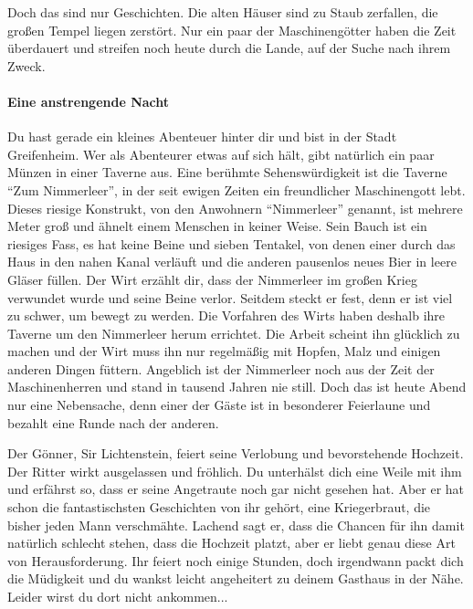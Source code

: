 Doch das sind nur Geschichten. Die alten Häuser sind zu Staub zerfallen, die großen Tempel liegen zerstört. Nur ein paar der Maschinengötter haben die Zeit überdauert und streifen noch heute durch die Lande, auf der Suche nach ihrem Zweck.

\paragraph{Eine anstrengende Nacht}

Du hast gerade ein kleines Abenteuer hinter dir und bist in der Stadt Greifenheim. Wer als Abenteurer etwas auf sich hält, gibt natürlich ein paar Münzen in einer Taverne aus. Eine berühmte Sehenswürdigkeit ist die Taverne ``Zum Nimmerleer'', in der seit ewigen Zeiten ein freundlicher Maschinengott lebt. Dieses riesige Konstrukt, von den Anwohnern ``Nimmerleer'' genannt, ist mehrere Meter groß und ähnelt einem Menschen in keiner Weise. Sein Bauch ist ein riesiges Fass, es hat keine Beine und sieben Tentakel, von denen einer durch das Haus in den nahen Kanal verläuft und die anderen pausenlos neues Bier in leere Gläser füllen.
Der Wirt erzählt dir, dass der Nimmerleer im großen Krieg verwundet wurde und seine Beine verlor. Seitdem steckt er fest, denn er ist viel zu schwer, um bewegt zu werden. Die Vorfahren des Wirts haben deshalb ihre Taverne um den Nimmerleer herum errichtet. Die Arbeit scheint ihn glücklich zu machen und der Wirt muss ihn nur regelmäßig mit Hopfen, Malz und einigen anderen Dingen füttern. Angeblich ist der Nimmerleer noch aus der Zeit der Maschinenherren und stand in tausend Jahren nie still. Doch das ist heute Abend nur eine Nebensache, denn einer der Gäste ist in besonderer Feierlaune und bezahlt eine Runde nach der anderen.

Der Gönner, Sir Lichtenstein, feiert seine Verlobung und bevorstehende Hochzeit. Der Ritter wirkt ausgelassen und fröhlich. Du unterhälst dich eine Weile mit ihm und erfährst so, dass er seine Angetraute noch gar nicht gesehen hat. Aber er hat schon die fantastischsten Geschichten von ihr gehört, eine Kriegerbraut, die bisher jeden Mann verschmähte. Lachend sagt er, dass die Chancen für ihn damit natürlich schlecht stehen, dass die Hochzeit platzt, aber er liebt genau diese Art von Herausforderung. Ihr feiert noch einige Stunden, doch irgendwann packt dich die Müdigkeit und du wankst leicht angeheitert zu deinem Gasthaus in der Nähe. Leider wirst du dort nicht ankommen...
